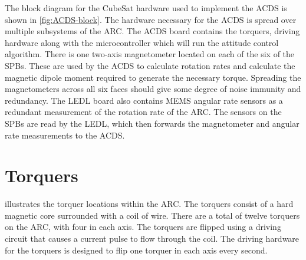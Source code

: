 The block diagram for the CubeSat hardware used to implement the \ac{ACDS} is shown in \cref{fig:ACDS-block}. The hardware necessary for the \ac{ACDS} is spread over multiple subsystems of the \ac{ARC}. The \ac{ACDS} board contains the torquers, driving hardware along with the microcontroller which will run the attitude control algorithm. There is one two-axis magnetometer located on each of the six of the \acp{SPB}. These are used by the \ac{ACDS} to calculate rotation rates and calculate the magnetic dipole moment required to generate the necessary torque. Spreading the magnetometers across all six faces should give some degree of noise immunity and redundancy. The \ac{LEDL} board also contains \ac{MEMS} angular rate sensors as a redundant measurement of the rotation rate of the \ac{ARC}. The sensors on the \acp{SPB} are read by the \ac{LEDL}, which then forwards the magnetometer and angular rate measurements to the \ac{ACDS}.

\section{Torquers}

 illustrates the torquer locations within the \ac{ARC}. The torquers consist of a hard magnetic core surrounded with a coil of wire. There are a total of twelve torquers on the \ac{ARC}, with four in each axis. The torquers are flipped using a driving circuit that causes a current pulse to flow through the coil. The driving hardware for the torquers is designed to flip one torquer in each axis every second.

